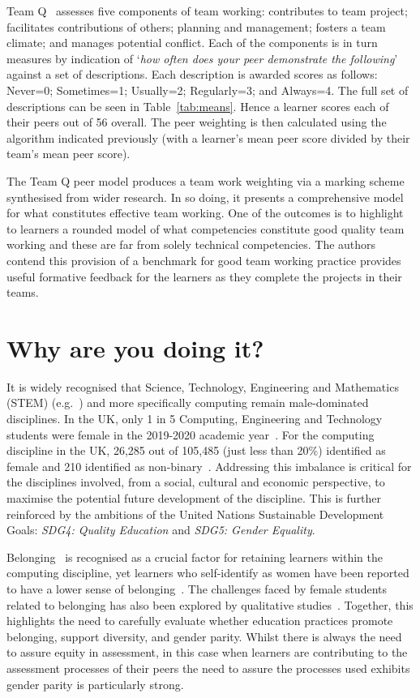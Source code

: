 \documentclass[sigconf, anonymous=false]{acmart}
\begin{document}
Team Q~\cite{Britton2017} assesses five components of team working:
contributes to team project; facilitates contributions of others;
planning and management; fosters a team climate; and manages potential
conflict. Each of the components is in turn measures by indication of
`{\emph{how often does your peer demonstrate the following}}' against
a set of descriptions. Each description is awarded scores as follows:
Never=0; Sometimes=1; Usually=2; Regularly=3; and Always=4. The
full set of descriptions can be seen in Table~\ref{tab:means}. Hence a
learner scores each of their peers out of 56 overall. The peer
weighting is then calculated using the algorithm indicated previously
(with a learner's mean peer score divided by their team's mean peer
score).
  
The Team Q peer model produces a team work weighting via a marking
scheme synthesised from wider research. In so doing, it presents a
comprehensive model for what constitutes effective team working. One
of the outcomes is to highlight to learners a rounded model of what
competencies constitute good quality team working and these are far
from solely technical competencies. The authors contend this provision
of a benchmark for good team working practice provides useful
formative feedback for the learners as they complete the projects in
their teams.

\section{Why are you doing it?}
It is widely recognised that Science, Technology, Engineering and
Mathematics (STEM) (e.g.~\cite{Baird2018}) and more specifically
computing remain male-dominated disciplines. In the UK, only 1 in 5
Computing, Engineering and Technology students were female in the
2019-2020 academic year~\cite{HESA}. For the computing discipline in
the UK, 26,285 out of 105,485 (just less than 20\%) identified as
female and 210 identified as non-binary~\cite{HESA}. Addressing this
imbalance is critical for the disciplines involved, from a social,
cultural and economic perspective, to maximise the potential future
development of the discipline. This is further reinforced by the
ambitions of the United Nations Sustainable Development Goals:
{\emph{SDG4: Quality Education}} and {\emph{SDG5: Gender Equality}}.

Belonging~\cite{Veilleux2013} is recognised as a crucial factor for
retaining learners within the computing discipline, yet learners who
self-identify as women have been reported to have a lower sense of
belonging~\cite{Mooney2020}. The challenges faced by female students
related to belonging has also been explored by qualitative
studies~\cite{Winter2021}. Together, this highlights the need to
carefully evaluate whether education practices promote belonging,
support diversity, and gender parity. Whilst there is always the need
to assure equity in assessment, in this case when learners are
contributing to the assessment processes of their peers the need to
assure the processes used exhibits gender parity is particularly
strong.
\end{document}
